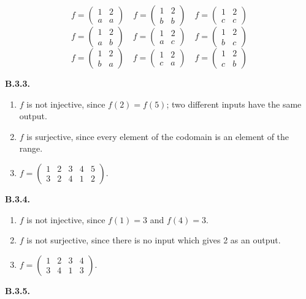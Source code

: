 \documentclass[10pt,]{book}
\theoremstyle{plain}
\theoremstyle{definition}
\theoremstyle{definition}
\theoremstyle{definition}
\theoremstyle{definition}
\numberwithin{equation}{chapter}
\newcommand{\twoline}[2]{\begin{pmatrix}#1 \\ #2 \end{pmatrix}}
\newcommand{\amp}{&}
\begin{document}
\begin{equation*}
f = \twoline{1 \amp 2}{a\amp a} \quad f = \twoline{1 \amp 2}{b \amp b} \quad f = \twoline{1 \amp 2}{c \amp c}
\end{equation*}
%
\begin{equation*}
f = \twoline{1 \amp 2}{a\amp b} \quad f = \twoline{1 \amp 2}{a \amp c} \quad f = \twoline{1 \amp 2}{b \amp c}
\end{equation*}
%
\begin{equation*}
f = \twoline{1 \amp 2}{b \amp a} \quad f = \twoline{1 \amp 2}{c \amp a} \quad f = \twoline{1 \amp 2}{c \amp b}
\end{equation*}
%
\par\smallskip
\noindent\textbf{B.3.3.} \hypertarget{p-1687}{}%
\leavevmode%
\begin{enumerate}[label=(\alph*)]
\item\hypertarget{li-564}{}\hypertarget{p-1688}{}%
\(f\) is not injective, since \(f(2) = f(5)\);  two different inputs have the same output.%
\item\hypertarget{li-565}{}\hypertarget{p-1689}{}%
\(f\) is surjective, since every element of the codomain is an element of the range.%
\item\hypertarget{li-566}{}\hypertarget{p-1690}{}%
\(f=\begin{pmatrix}1 \amp 2 \amp 3 \amp 4 \amp 5 \\ 3 \amp 2 \amp 4 \amp 1 \amp 2\end{pmatrix}\).%
\end{enumerate}
%
\par\smallskip
\noindent\textbf{B.3.4.} \hypertarget{p-1696}{}%
\leavevmode%
\begin{enumerate}[label=(\alph*)]
\item\hypertarget{li-570}{}\hypertarget{p-1697}{}%
\(f\) is not injective, since \(f(1) = 3\) and \(f(4) = 3\).%
\item\hypertarget{li-571}{}\hypertarget{p-1698}{}%
\(f\) is not surjective, since there is no input which gives 2 as an output.%
\item\hypertarget{li-572}{}\hypertarget{p-1699}{}%
\(f=\begin{pmatrix} 1 \amp 2 \amp 3 \amp 4 \\ 3 \amp 4 \amp 1 \amp 3\end{pmatrix}\).%
\end{enumerate}
%
\par\smallskip
\noindent\textbf{B.3.5.} \hypertarget{p-1701}{}%
\leavevmode%
\end{document}
